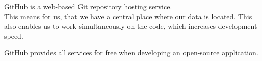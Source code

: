 GitHub is a web-based Git repository hosting service. \cite{github} \\
This means for us, that we have a central place where our data is located. This also enables us to work simultaneously on the code, which increases development speed.

GitHub provides all services for free when developing an open-source application. \cite{githubprice}
